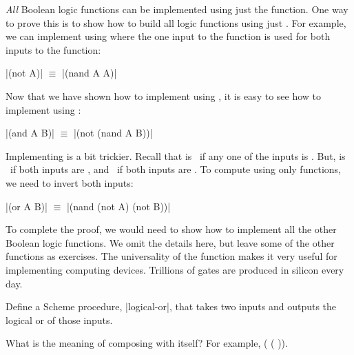 \begin{schemeregion}
\emph{All} Boolean logic functions can be implemented using just the  function.  One way to prove this is to show how to build all logic functions using just .  For example, we can implement  using  where the one input to the  function is used for both inputs to the  function: 
\begin{center}
\scheme|(not A)| $\equiv$ \scheme|(nand A A)|
\end{center}
Now that we have shown how to implement  using , it is easy to see how to implement  using :
\begin{center}
\scheme|(and A B)| $\equiv$ \scheme|(not (nand A B))|
\end{center}

Implementing  is a bit trickier.  Recall that    is \true\ if any one of the inputs is \true.  But,    is \true\ if both inputs are \false, and \false\ if both inputs are \true.  To compute  using only  functions, we need to invert both inputs:
\begin{center}
\scheme|(or A B)| $\equiv$ \scheme|(nand (not A) (not B))|
\end{center}

To complete the proof, we would need to show how to implement all the other Boolean logic functions.  We omit the details here, but leave some of the other functions as exercises.  The universality of the  function makes it very useful for implementing computing devices.  Trillions of  gates are produced in silicon every day.

\beforeex
\begin{exercise}
Define a Scheme procedure, \scheme|logical-or|, that takes two inputs and outputs the logical or of those inputs.
\end{exercise}
\afterex

\beforeex
\begin{exercise}\label{ex:notnot}
What is the meaning of composing  with itself?  For example, ( ( )).
\end{exercise}
\afterex


\end{schemeregion}
